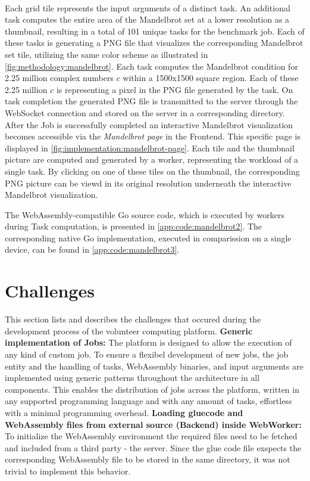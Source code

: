 ~\\
Each grid tile represents the input arguments of a distinct task. An additional task computes the entire area of the Mandelbrot set at a lower resolution as a thumbnail, resulting in a total of 101 unique tasks for the benchmark job. Each of these tasks is generating a \ac{PNG} file that visualizes the corresponding Mandelbrot set tile, utilizing the same color scheme as illustrated in \autoref{fig:methodology:mandelbrot}. Each task computes the Mandelbrot condition for 2.25 million complex numbers $c$ within a 1500x1500 square region. Each of these 2.25 million $c$ is representing a pixel in the \ac{PNG} file generated by the task. On task completion the generated \ac{PNG} file is transmitted to the server through the WebSocket connection and stored on the server in a corresponding directory. After the Job is successfully completed an interactive Mandelbrot visualization becomes accessible via the \emph{Mandelbrot page} in the Frontend. This specific page is displayed in \autoref{fig:implementation:mandelbrot-page}. Each tile and the thumbnail picture are computed and generated by a worker, representing the workload of a single task. By clicking on one of these tiles on the thumbnail, the corresponding \ac{PNG} picture can be viewd in its original resolution underneath the interactive Mandelbrot visualization.

The WebAssembly-compatible Go source code, which is executed by workers during Task computation, is presented in \autoref{app:code:mandelbrot2}. The corresponding native Go implementation, executed in comparission on a single device, can be found in \autoref{app:code:mandelbrot3}.

\section{Challenges}
\label{sec:implementation:challenges}
This section lists and describes the  challenges that occured during the development process of the volunteer computing platform.
\newline
\newline
\textbf{Generic implementation of Jobs:}
\newline
The platform is designed to allow the execution of any kind of custom job. To ensure a flexibel development of new jobs, the job entity and the handling of tasks, WebAssembly binaries, and input arguments are implemented using generic patterns throughout the architecture in all components. This enables the distribution of jobs across the platform, written in any supported programming language and with any amount of tasks, effortless with a minimal programming overhead.
\newline
\newline
\textbf{Loading gluecode and WebAssembly files from external source (Backend) inside WebWorker:}
\newline
To initialize the WebAssembly environment the required files need to be fetched and included from a third party - the server. Since the glue code file exspects the corresponding WebAssembly file to be stored in the same directory, it was not trivial to implement this behavior.

